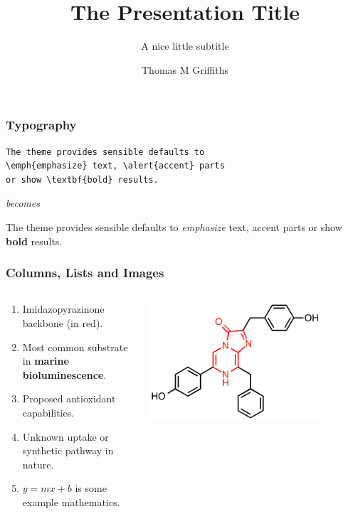 \documentclass[aspectratio=1610]{beamer}
\title{The Presentation Title}
\subtitle{A nice little subtitle}
\author[Thomas]{Thomas M Griffiths}
\institute{School of Chemistry}
\date{}
\begin{document}
\maketitle

\begin{frame}[fragile]
\frametitle{Typography}
\begin{verbatim}
The theme provides sensible defaults to 
\emph{emphasize} text, \alert{accent} parts 
or show \textbf{bold} results.
\end{verbatim}
\begin{center} \textit{becomes} \end{center}
The theme provides sensible defaults to \emph{emphasize} text, \alert{accent} parts or show \textbf{bold} results.
\end{frame}

\begin{frame}
   \frametitle{Columns, Lists and Images}
   \begin{columns}
      \begin{column}{0.5\textwidth}
         \begin{enumerate}
            \item Imidazopyrazinone backbone (in red).
            \item Most common substrate in \textbf{marine bioluminescence}.
            \item Proposed antioxidant capabilities.
            \item Unknown uptake or synthetic pathway in nature.
            \item $y=mx+b$ is some example mathematics.
         \end{enumerate}
      \end{column}
      \begin{column}{0.5\textwidth}
         \centering
         \includegraphics[width=0.8\textwidth]{coelenterazine.png}
      \end{column}
   \end{columns}
\end{frame}
\end{document}
